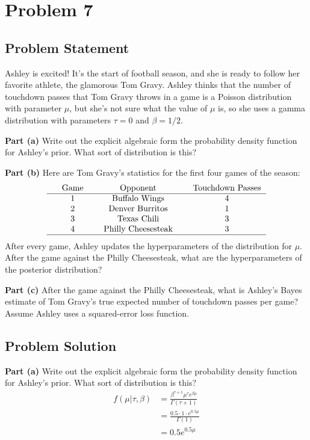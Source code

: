 \documentclass[12pt]{article}
\theoremstyle{definition}
\begin{document}
\newpage
\section*{Problem 7}

\subsection*{Problem Statement}

Ashley is excited! It's the start of football season, and she is ready to follow her favorite athlete, the glamorous Tom Gravy. Ashley thinks that the number of touchdown passes that Tom Gravy throws in a game is a Poisson distribution with parameter $\mu$, but she's not sure what the value of $\mu$ is, so she uses a gamma distribution with parameters $\tau = 0$ and $\beta = 1/2$.

\bigskip
\noindent
{\bf Part (a)} Write out the explicit algebraic form the probability density function for Ashley's prior. What sort of distribution is this?

\bigskip
\noindent
{\bf Part (b)} Here are Tom Gravy's statistics for the first four games of the season:
$$
\begin{tabular}{ccccccc}
& Game & & Opponent & & Touchdown Passes\\
\hline
& 1 & & Buffalo Wings & & 4\\
& 2 & & Denver Burritos & & 1\\
& 3 & & Texas Chili & & 3\\
& 4 & & Philly Cheesesteak & & 3\\
\hline
\end{tabular}
$$
After every game, Ashley updates the hyperparameters of the distribution for $\mu$. After the game against the Philly Cheesesteak, what are the hyperparameters of the posterior distribution?

\bigskip
\noindent
{\bf Part (c)} After the game against the Philly Cheesesteak, what is Ashley's Bayes estimate of Tom Gravy's true expected number of touchdown passes per game? Assume Ashley uses a squared-error loss function.

\newpage
\subsection*{Problem Solution}

\noindent
{\bf Part (a)} Write out the explicit algebraic form the probability density function for Ashley's prior. What sort of distribution is this?
\begin{align*}
f(\mu|\tau, \beta) &= \frac{\beta^{\tau + 1}\mu^\tau e^{\beta\mu}}{\Gamma(\tau + 1)}\\
&= \frac{0.5 \cdot 1 \cdot e^{0.5\mu}}{\Gamma(1)}\\
&= 0.5 e^{0.5\mu}
\end{align*}
\end{document}
